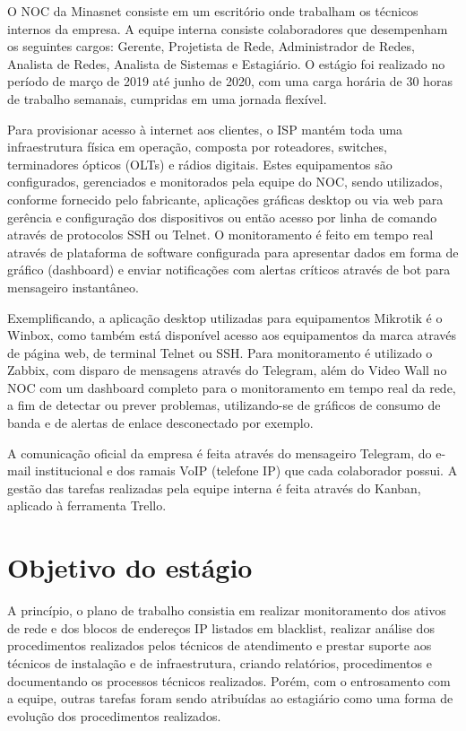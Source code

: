    O NOC da Minasnet consiste em um escritório onde trabalham os técnicos internos da empresa. A equipe interna consiste colaboradores que desempenham os seguintes cargos: Gerente, Projetista de Rede, Administrador de Redes, Analista de Redes, Analista de Sistemas e Estagiário. O estágio foi realizado no período de março de 2019 até junho de 2020, com uma carga horária de 30 horas de trabalho semanais, cumpridas em uma jornada flexível.

    Para provisionar acesso à internet aos clientes, o ISP mantém toda uma infraestrutura física em operação, composta por roteadores, switches, terminadores ópticos (OLTs) e rádios digitais. Estes equipamentos são configurados, gerenciados e monitorados pela equipe do NOC, sendo utilizados, conforme fornecido pelo fabricante, aplicações gráficas desktop ou via web para gerência e configuração dos dispositivos ou então acesso por linha de comando através de protocolos SSH ou Telnet. O monitoramento é feito em tempo real através de plataforma de software configurada para apresentar dados em forma de gráfico (dashboard) e enviar notificações com alertas críticos através de bot para mensageiro instantâneo.
    
    Exemplificando, a aplicação desktop utilizadas para equipamentos Mikrotik é o Winbox, como também está disponível acesso aos equipamentos da marca através de página web, de terminal Telnet ou SSH. Para monitoramento é utilizado o Zabbix, com disparo de mensagens através do Telegram, além do Video Wall no NOC com um dashboard completo para o monitoramento em tempo real da rede, a fim de detectar ou prever problemas, utilizando-se de gráficos de consumo de banda e de alertas de enlace desconectado por exemplo.

    A comunicação oficial da empresa é feita através do mensageiro Telegram, do e-mail institucional e dos ramais VoIP (telefone IP) que cada colaborador possui. A gestão das tarefas realizadas pela equipe interna é feita através do Kanban, aplicado à ferramenta Trello.

\section{Objetivo do estágio}

    A princípio, o plano de trabalho consistia em realizar monitoramento dos ativos de rede e dos blocos de endereços IP listados em blacklist, realizar análise dos procedimentos realizados pelos técnicos de atendimento e prestar suporte aos técnicos de instalação e de infraestrutura, criando relatórios, procedimentos e documentando os processos técnicos realizados. Porém, com o entrosamento com a equipe, outras tarefas foram sendo atribuídas ao estagiário como uma forma de evolução dos procedimentos realizados.
    
